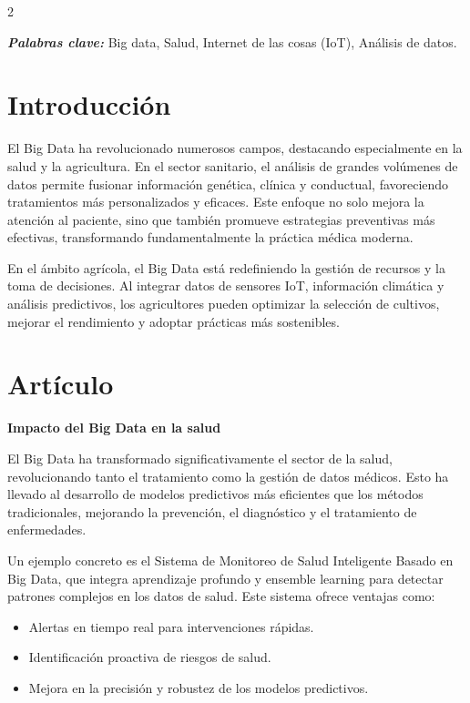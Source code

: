 \documentclass[12pt,spanish,Letterpaper,openany]{book}
\begin{document}
\begin {multicols}{2}

\textbf{\emph{Palabras clave:}} Big data, Salud, Internet de las cosas (IoT), Análisis de datos.

\hypertarget{introducciuxf3n-13}{%
\section{Introducción}\label{introducciuxf3n-13}}

El Big Data ha revolucionado numerosos campos, destacando especialmente en la salud y la agricultura. En el sector sanitario, el análisis de grandes volúmenes de datos permite fusionar información genética, clínica y conductual, favoreciendo tratamientos más personalizados y eficaces. Este enfoque no solo mejora la atención al paciente, sino que también promueve estrategias preventivas más efectivas, transformando fundamentalmente la práctica médica moderna.

En el ámbito agrícola, el Big Data está redefiniendo la gestión de recursos y la toma de decisiones. Al integrar datos de sensores IoT, información climática y análisis predictivos, los agricultores pueden optimizar la selección de cultivos, mejorar el rendimiento y adoptar prácticas más sostenibles.

\hypertarget{artuxedculo-13}{%
\section{Artículo}\label{artuxedculo-13}}

\textbf{Impacto del Big Data en la salud}

El Big Data ha transformado significativamente el sector de la salud, revolucionando tanto el tratamiento como la gestión de datos médicos. Esto ha llevado al desarrollo de modelos predictivos más eficientes que los métodos tradicionales, mejorando la prevención, el diagnóstico y el tratamiento de enfermedades.

Un ejemplo concreto es el Sistema de Monitoreo de Salud Inteligente Basado en Big Data, que integra aprendizaje profundo y ensemble learning para detectar patrones complejos en los datos de salud. Este sistema ofrece ventajas como:

\begin{itemize}
\item
  Alertas en tiempo real para intervenciones rápidas.
\item
  Identificación proactiva de riesgos de salud.
\item
  Mejora en la precisión y robustez de los modelos predictivos.
\end{itemize}


\end{multicols}
\end{document}
